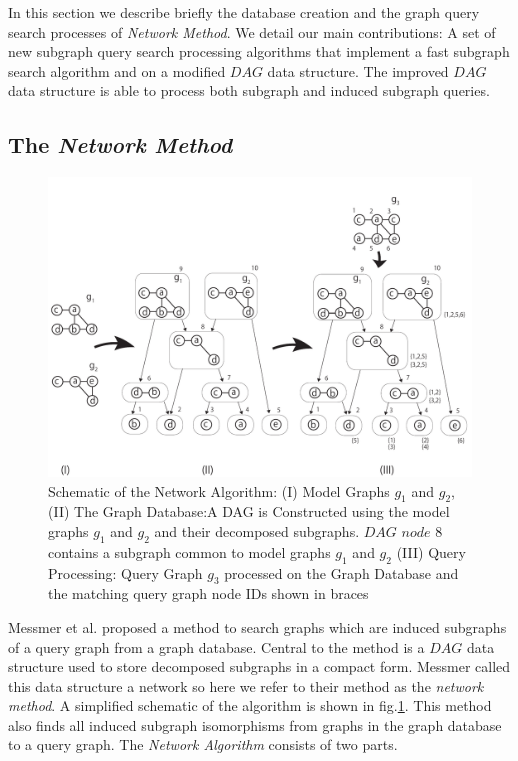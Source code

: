 In this section we describe briefly the database creation and the graph query search processes of  \textit{Network Method}. We detail our main contributions: A set of new subgraph query search processing algorithms that implement a fast subgraph search algorithm and on a modified $DAG$ data structure. The improved $DAG$ data structure is able to process both subgraph and induced subgraph queries.

\subsection{The \textit{Network Method}}
 

\begin{figure}
\centering
\includegraphics[width=1.0\textwidth]{dag_construction_query_processing6.pdf}
\caption{Schematic of the Network Algorithm: (I) Model Graphs $g_1$ and $g_2$, (II) The Graph Database:A DAG is Constructed using  the model graphs $g_1$ and $g_2$ and their decomposed subgraphs. $DAG$ $node$ $8$ contains a subgraph common to model graphs $g_1$ and $g_2$  (III) Query Processing: Query Graph $g_3$ processed on the Graph Database and the matching query graph node IDs shown in braces}
\label{fig:fig2}
\end{figure}


Messmer et al.\cite{messmer_bunke2000} proposed a method to search graphs which are induced subgraphs of a query graph from a graph database. Central to the method is a $DAG$ data structure used to store decomposed subgraphs in a compact form. Messmer called this data structure a network so here we refer to their method as the \textit{network method}. 
A simplified schematic of the algorithm is shown in fig.\ref{fig:fig2}. 
This method also finds all induced subgraph isomorphisms from graphs in the graph database to a query graph.
The \textit{Network Algorithm} consists of two parts.

